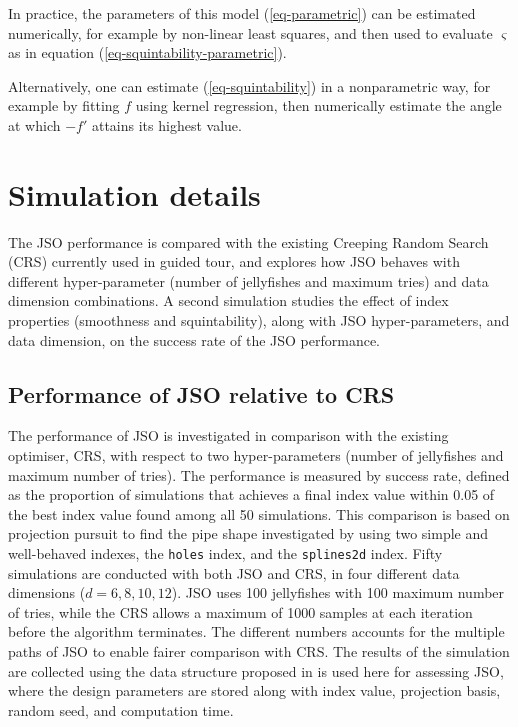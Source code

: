 \documentclass[
  number,
  preprint,
  3p]{elsarticle}
\begin{document}
In practice, the parameters of this model (\ref{eq-parametric}) can be
estimated numerically, for example by non-linear least squares, and then
used to evaluate \(\varsigma\) as in equation
(\ref{eq-squintability-parametric}).

Alternatively, one can estimate (\ref{eq-squintability}) in a
nonparametric way, for example by fitting \(f\) using kernel regression,
then numerically estimate the angle at which \(-f'\) attains its highest
value.

\section{Simulation details}\label{sec-sim-deets}

The JSO performance is compared with the existing Creeping Random Search
(CRS) \citep{RJ-2021-105, laa_using_2020} currently used in guided tour,
and explores how JSO behaves with different hyper-parameter (number of
jellyfishes and maximum tries) and data dimension combinations. A second
simulation studies the effect of index properties (smoothness and
squintability), along with JSO hyper-parameters, and data dimension, on
the success rate of the JSO performance.

\subsection{Performance of JSO relative to CRS}\label{sec-app-1}

The performance of JSO is investigated in comparison with the existing
optimiser, CRS, with respect to two hyper-parameters (number of
jellyfishes and maximum number of tries). The performance is measured by
success rate, defined as the proportion of simulations that achieves a
final index value within 0.05 of the best index value found among all 50
simulations. This comparison is based on projection pursuit to find the
pipe shape investigated by \citet{laa_using_2020} using two simple and
well-behaved indexes, the \texttt{holes} index, and the
\texttt{splines2d} index. Fifty simulations are conducted with both JSO
and CRS, in four different data dimensions (\(d = 6, 8, 10, 12\)). JSO
uses 100 jellyfishes with 100 maximum number of tries, while the CRS
allows a maximum of 1000 samples at each iteration before the algorithm
terminates. The different numbers accounts for the multiple paths of JSO
to enable fairer comparison with CRS. The results of the simulation are
collected using the data structure proposed in \citet{RJ-2021-105} is
used here for assessing JSO, where the design parameters are stored
along with index value, projection basis, random seed, and computation
time.
\end{document}
